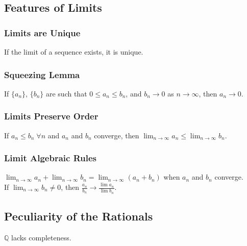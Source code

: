 \documentclass[11pt]{article}
\newcommand{\0}{\emptyset}
\newcommand{\Q}{\mathbb{Q}}
\begin{document}
\subsection*{Features of Limits}
\label{sec:orge8b7a10}
\subsubsection*{Limits are Unique}
\label{sec:org4161a76}
If the limit of a sequence exists, it is unique.\\[0pt]
\subsubsection*{Squeezing Lemma}
\label{sec:orgee5f6b6}
If \(\{a_{n}\}\), \(\{b_{n}\}\) are such that \(0\leq a_{n}\leq b_{n}\), and \(b_{n}\to0\) as \(n\to\infty\), then \(a_{n}\to0\).\\[0pt]
\subsubsection*{Limits Preserve Order}
\label{sec:orgd60d217}
If \(a_{n}\leq b_{n}\;\forall n\) and \(a_{n}\) and \(b_{n}\) converge, then \(\lim_{n\to\infty}a_{n}\leq\lim_{n\to\infty}b_{n}\).\\[0pt]
\subsubsection*{Limit Algebraic Rules}
\label{sec:org0bb7e29}
\(\lim_{n\to\infty}a_{n}+\lim_{n\to\infty}b_{n}=\lim_{n\to\infty}(a_{n}+b_{n})\) when \(a_{n}\) and \(b_{n}\) converge.\\[0pt]
If \(\lim_{n\to\infty}b_{n}\neq 0\), then \(\frac{a_{n}}{b_{n}} \to\frac{\lim a_{n}}{\lim b_{n}}\).\\[0pt]
\subsection*{Peculiarity of the Rationals}
\label{sec:orgedb2bab}
\(\Q\) lacks completeness.\\[0pt]
\end{document}
